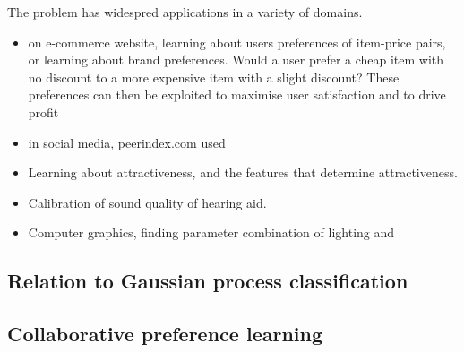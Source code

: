 The problem has widespred applications in a variety of domains.
\begin{itemize}
	\item on e-commerce website, learning about users preferences of item-price pairs, or learning about brand preferences. Would a user prefer a cheap item with no discount to a more expensive item with a slight discount? These preferences can then be exploited to maximise user satisfaction and to drive profit
	\item in social media, peerindex.com used 
	\item Learning about attractiveness, and the features that determine attractiveness. 
	\item Calibration of sound quality of hearing aid. 
	\item Computer graphics, finding parameter combination of lighting and 
\end{itemize}

\subsection{Relation to Gaussian process classification}

\subsection{Collaborative preference learning}
